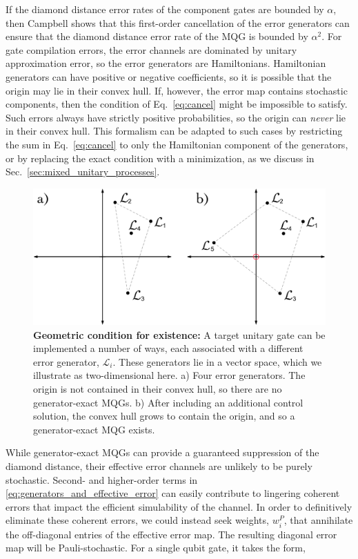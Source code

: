 \documentclass[aps,nofootinbib,pra,notitlepage,twocolumn]{revtex4-1}
\newcommand{\genmat}{\ensuremath{{\mathcal{L}}}}
\newcommand{\0}{\ensuremath{\mathbf{0}}}
\newcommand{\weight}{\ensuremath{w}}
\begin{document}
If the diamond distance error rates of the component gates are bounded by $\alpha$, then Campbell shows that this first-order cancellation of the error generators can ensure that the diamond distance error rate of the MQG is bounded by $\alpha^2$. For gate compilation errors, the error channels are dominated by unitary approximation error, so the error generators are Hamiltonians. Hamiltonian generators can have positive or negative coefficients, so it is possible that the origin may lie in their convex hull. If, however, the error map contains stochastic components, then the condition of Eq.~\eqref{eq:cancel} might be impossible to satisfy. Such errors always have strictly positive probabilities, so the origin can \emph{never} lie in their convex hull. This formalism can be adapted to such cases by restricting the sum in Eq.~\eqref{eq:cancel} to only the Hamiltonian component of the generators, or by replacing the exact condition with a minimization, as we discuss in Sec.~\ref{sec:mixed_unitary_processes}. 

\begin{figure}
  \centering
  \includegraphics[width=\columnwidth]{vectorspace.pdf}
  \caption{\textbf{Geometric condition for existence:} A target unitary gate can be implemented a number of ways, each associated with a different error generator, $\genmat_i$. These generators lie in a vector space, which we illustrate as two-dimensional here. a) Four error generators. The origin is not contained in their convex hull, so there are no generator-exact MQGs. b) After including an additional control solution, the convex hull grows to contain the origin, and so a generator-exact MQG exists. }
  \label{fig:vectorspace}
\end{figure}

While generator-exact MQGs can provide a guaranteed suppression of the diamond distance, their effective error channels are unlikely to be purely stochastic. Second- and higher-order terms in \eqref{eq:generators_and_effective_error} can easily contribute to lingering coherent errors that impact the efficient simulability of the channel. In order to definitively eliminate these coherent errors, we could instead seek weights, $\weight^P_i$, that annihilate the off-diagonal entries of the effective error map. The resulting diagonal error map will be Pauli-stochastic. For a single qubit gate, it takes the form,
\end{document}

